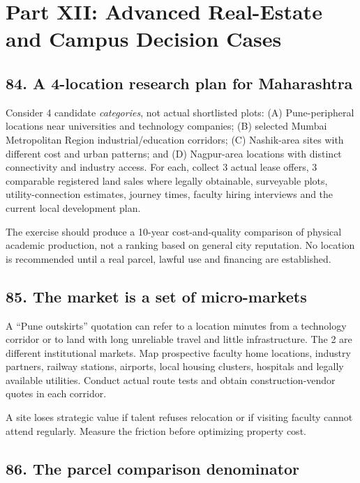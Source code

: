 \section*{Part XII: Advanced Real-Estate and Campus Decision Cases}


\subsection{84. A 4-location research plan for Maharashtra}

Consider 4 candidate \textit{categories}, not actual shortlisted plots: (A) Pune-peripheral locations near universities and technology companies; (B) selected Mumbai Metropolitan Region industrial/education corridors; (C) Nashik-area sites with different cost and urban patterns; and (D) Nagpur-area locations with distinct connectivity and industry access. For each, collect 3 actual lease offers, 3 comparable registered land sales where legally obtainable, surveyable plots, utility-connection estimates, journey times, faculty hiring interviews and the current local development plan.

The exercise should produce a 10-year cost-and-quality comparison of physical academic production, not a ranking based on general city reputation. No location is recommended until a real parcel, lawful use and financing are established.


\subsection{85. The market is a set of micro-markets}

A ``Pune outskirts'' quotation can refer to a location minutes from a technology corridor or to land with long unreliable travel and little infrastructure. The 2 are different institutional markets. Map prospective faculty home locations, industry partners, railway stations, airports, local housing clusters, hospitals and legally available utilities. Conduct actual route tests and obtain construction-vendor quotes in each corridor.

A site loses strategic value if talent refuses relocation or if visiting faculty cannot attend regularly. Measure the friction before optimizing property cost.


\subsection{86. The parcel comparison denominator}

